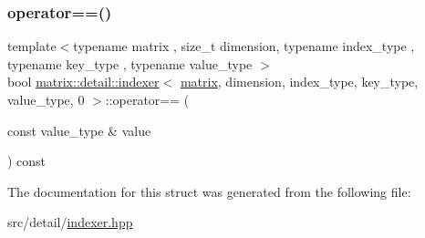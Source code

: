 \subsubsection{\texorpdfstring{operator==()}{operator==()}}
{\footnotesize\ttfamily template$<$typename matrix , size\+\_\+t dimension, typename index\+\_\+type , typename key\+\_\+type , typename value\+\_\+type $>$ \\
bool \hyperlink{structmatrix_1_1detail_1_1indexer}{matrix\+::detail\+::indexer}$<$ \hyperlink{structmatrix_1_1matrix}{matrix}, dimension, index\+\_\+type, key\+\_\+type, value\+\_\+type, 0 $>$\+::operator== (\begin{DoxyParamCaption}\item[{const value\+\_\+type \&}]{value }\end{DoxyParamCaption}) const\hspace{0.3cm}{\ttfamily [inline]}}



The documentation for this struct was generated from the following file\+:\begin{DoxyCompactItemize}
\item 
src/detail/\hyperlink{indexer_8hpp}{indexer.\+hpp}\end{DoxyCompactItemize}
